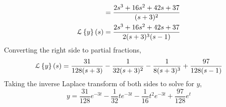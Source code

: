 \begin{enumerate}[label=\arabic*.]
\begin{align*}
			&= \frac{2s^3 + 16s^2 + 42s + 37}{(s+3)^2} \\
			\mathcal{L}\left\{ y \right\}\left(s\right) &= \frac{2s^3 + 16s^2 + 42s + 37}{2(s+3)^3(s-1)}
		\end{align*}
		Converting the right side to partial fractions,
		\begin{equation*}
			\mathcal{L}\left\{ y \right\}\left(s\right) = \frac{31}{128(s+3)} - \frac{1}{32(s+3)^2} - \frac{1}{8(s+3)^3} + \frac{97}{128(s-1)}
		\end{equation*}
		Taking the inverse Laplace transform of both sides to solve for $y$,
		\begin{equation*}
			y = \frac{31}{128}e^{-3t} - \frac{1}{32}te^{-3t} - \frac{1}{16}t^2e^{-3t} + \frac{97}{128}e^{t}
		\end{equation*}
\end{enumerate}